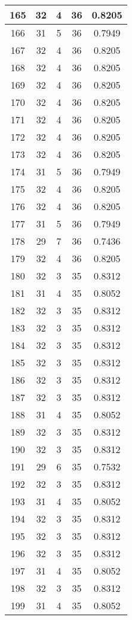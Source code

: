 \documentclass[letterpaper, 12pt]{article}
\begin{document}
\begin{longtable}{|c|c|c|c|c|}
\hline
165 & 32 & 4 & 36 & 0.8205 \\
\hline
166 & 31 & 5 & 36 & 0.7949 \\
\hline
167 & 32 & 4 & 36 & 0.8205 \\
\hline
168 & 32 & 4 & 36 & 0.8205 \\
\hline
169 & 32 & 4 & 36 & 0.8205 \\
\hline
170 & 32 & 4 & 36 & 0.8205 \\
\hline
171 & 32 & 4 & 36 & 0.8205 \\
\hline
172 & 32 & 4 & 36 & 0.8205 \\
\hline
173 & 32 & 4 & 36 & 0.8205 \\
\hline
174 & 31 & 5 & 36 & 0.7949 \\
\hline
175 & 32 & 4 & 36 & 0.8205 \\
\hline
176 & 32 & 4 & 36 & 0.8205 \\
\hline
177 & 31 & 5 & 36 & 0.7949 \\
\hline
178 & 29 & 7 & 36 & 0.7436 \\
\hline
179 & 32 & 4 & 36 & 0.8205 \\
\hline
180 & 32 & 3 & 35 & 0.8312 \\
\hline
181 & 31 & 4 & 35 & 0.8052 \\
\hline
182 & 32 & 3 & 35 & 0.8312 \\
\hline
183 & 32 & 3 & 35 & 0.8312 \\
\hline
184 & 32 & 3 & 35 & 0.8312 \\
\hline
185 & 32 & 3 & 35 & 0.8312 \\
\hline
186 & 32 & 3 & 35 & 0.8312 \\
\hline
187 & 32 & 3 & 35 & 0.8312 \\
\hline
188 & 31 & 4 & 35 & 0.8052 \\
\hline
189 & 32 & 3 & 35 & 0.8312 \\
\hline
190 & 32 & 3 & 35 & 0.8312 \\
\hline
191 & 29 & 6 & 35 & 0.7532 \\
\hline
192 & 32 & 3 & 35 & 0.8312 \\
\hline
193 & 31 & 4 & 35 & 0.8052 \\
\hline
194 & 32 & 3 & 35 & 0.8312 \\
\hline
195 & 32 & 3 & 35 & 0.8312 \\
\hline
196 & 32 & 3 & 35 & 0.8312 \\
\hline
197 & 31 & 4 & 35 & 0.8052 \\
\hline
198 & 32 & 3 & 35 & 0.8312 \\
\hline
199 & 31 & 4 & 35 & 0.8052 \\
\hline
\end{longtable}
\end{document}
